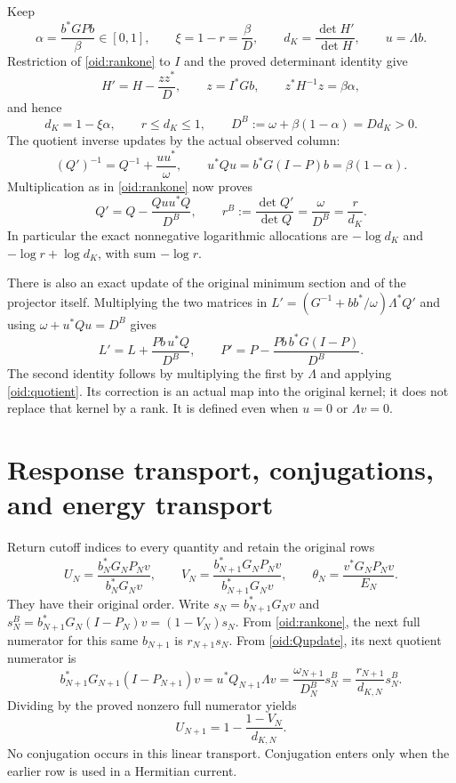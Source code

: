 \documentclass[11pt,a4paper]{article}
\begin{document}
Keep
\[
 \alpha=\frac{b^*GPb}{\beta}\in[0,1],\qquad
 \xi=1-r=\frac\beta D,\qquad
 d_K=\frac{\det H'}{\det H},\qquad u=\Lambda b.
\]
Restriction of \eqref{oid:rankone} to $I$ and the proved determinant
identity give
\[
 H'=H-\frac{zz^*}{D},\qquad z=I^*Gb,\qquad
 z^*H^{-1}z=\beta\alpha,
\]
and hence
\begin{equation}\label{oid:allocations}
 d_K=1-\xi\alpha,\qquad r\le d_K\le1,\qquad
 D^B:=\omega+\beta(1-\alpha)=Dd_K>0.
\end{equation}
The quotient inverse updates by the actual observed column:
\[
 (Q')^{-1}=Q^{-1}+\frac{uu^*}{\omega},\qquad
 u^*Qu=b^*G(I-P)b=\beta(1-\alpha).
\]
Multiplication as in \eqref{oid:rankone} now proves
\begin{equation}\label{oid:Qupdate}
 Q'=Q-\frac{Quu^*Q}{D^B},\qquad
 r^B:=\frac{\det Q'}{\det Q}
 =\frac\omega{D^B}=\frac r{d_K}.
\end{equation}
In particular the exact nonnegative logarithmic allocations are
$-\log d_K$ and $-\log r+\log d_K$, with sum $-\log r$.

There is also an exact update of the original minimum section and
of the projector itself. Multiplying the two matrices in
$L'=(G^{-1}+bb^*/\omega)\Lambda^*Q'$ and using
$\omega+u^*Qu=D^B$ gives
\begin{equation}\label{oid:projector}
 L'=L+\frac{Pb\,u^*Q}{D^B},\qquad
 P'=P-\frac{Pb\,b^*G(I-P)}{D^B}.
\end{equation}
The second identity follows by multiplying the first by $\Lambda$
and applying \eqref{oid:quotient}. Its correction is an actual map
into the original kernel; it does not replace that kernel by a rank.
It is defined even when $u=0$ or $\Lambda v=0$.

\section{Response transport, conjugations, and energy transport}

Return cutoff indices to every quantity and retain the original rows
\begin{equation}\label{oid:UV}
 U_N=\frac{b_N^*G_NP_Nv}{b_N^*G_Nv},\qquad
 V_N=\frac{b_{N+1}^*G_NP_Nv}{b_{N+1}^*G_Nv},\qquad
 \theta_N=\frac{v^*G_NP_Nv}{E_N}.
\end{equation}
They have their original order. Write
$s_N=b_{N+1}^*G_Nv$ and
$s_N^B=b_{N+1}^*G_N(I-P_N)v=(1-V_N)s_N$.
From \eqref{oid:rankone}, the next full numerator for this same
$b_{N+1}$ is $r_{N+1}s_N$. From \eqref{oid:Qupdate}, its next
quotient numerator is
\begin{equation}\label{oid:transportnumerator}
 b_{N+1}^*G_{N+1}(I-P_{N+1})v
 =u^*Q_{N+1}\Lambda v
 =\frac{\omega_{N+1}}{D_N^B}s_N^B
 =\frac{r_{N+1}}{d_{K,N}}s_N^B.
\end{equation}
Dividing by the proved nonzero full numerator yields
\begin{equation}\label{oid:response}
 \boxed{U_{N+1}=1-\frac{1-V_N}{d_{K,N}}.}
\end{equation}
No conjugation occurs in this linear transport. Conjugation enters
only when the earlier row is used in a Hermitian current.
\end{document}
